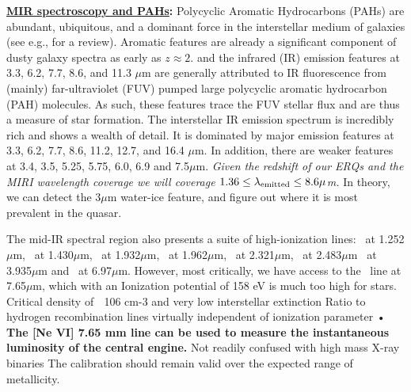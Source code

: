 \smallskip
\smallskip
\noindent
{\bf \underline{MIR spectroscopy and PAHs}:}
Polycyclic Aromatic Hydrocarbons (PAHs) are abundant, ubiquitous, and
a dominant force in the interstellar medium of galaxies (see e.g., for
a review).  Aromatic features are already a significant component of
dusty galaxy spectra as early as $z\approx2$.  and the infrared (IR) emission features at 3.3, 6.2, 7.7,
8.6, and 11.3 $\mu$m are generally attributed to IR fluorescence from
(mainly) far-ultraviolet (FUV) pumped large polycyclic aromatic
hydrocarbon (PAH) molecules. As such, these features trace the FUV
stellar flux and are thus a measure of star formation.  The
interstellar IR emission spectrum is incredibly rich and shows a
wealth of detail.  It is dominated by major emission features at 3.3,
6.2, 7.7, 8.6, 11.2, 12.7, and 16.4 $\mu$m.  In addition, there are
weaker features at 3.4, 3.5, 5.25, 5.75, 6.0, 6.9 and 7.5$\mu$m.  
{\it Given the redshift of our ERQs and
the MIRI wavelength coverage we will coverage $1.36 \leq \lambda_{\rm
emitted} \leq 8.6 \mu$m.}
In theory, we can detect the 3$\mu$m water-ice feature, 
and figure out where it is most prevalent in the quasar. 

\smallskip
\smallskip
\noindent
The mid-IR spectral region
also presents a suite of high-ionization lines: \snine\ at
1.252$\mu$m, \six\ at 1.430$\mu$m, \sixi\ at 1.932$\mu$m, \sivi\ at
1.962$\mu$m, \caviii\ at 2.321$\mu$m, \sivi\ at 2.483$\mu$m \siix\ at
3.935$\mu$m and \arii\ at 6.97$\mu$m.
However, most critically, we have access to the 
\nevi\ line at 7.65$\mu$m, which with an Ionization potential of 158 eV is much too high for stars.
 Critical density of  106 cm-3 and very low interstellar extinction
 Ratio to hydrogen recombination lines virtually independent of ionization parameter • 
{\bf The [Ne VI] 7.65 mm line can be used to measure the instantaneous luminosity of the central engine.}
Not readily confused with high mass X-ray binaries
%
The calibration should remain valid over the expected range of metallicity.


